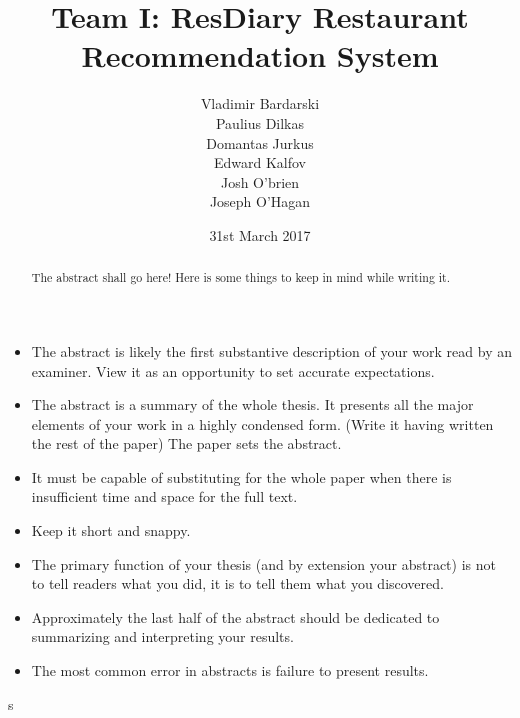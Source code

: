 \documentclass{l3proj}
\begin{document}
\title{Team I: ResDiary Restaurant Recommendation System}

\author{Vladimir Bardarski \\
        Paulius Dilkas \\
        Domantas Jurkus \\
        Edward Kalfov \\
        Josh O'brien \\
		Joseph O'Hagan}

\date{31st March 2017}

\maketitle

\begin{abstract}
The abstract shall go here! Here is some things to keep in mind while writing it.
\end{abstract}

\begin{itemize}
\item The abstract is likely the first substantive description of your work read by an examiner. View it as an opportunity to set accurate expectations.
\item The abstract is a summary of the whole thesis. It presents all the major elements of your work in a highly condensed form. (Write it having written the rest of the paper) The paper sets the abstract.
\item It must be capable of substituting for the whole paper when there is insufficient time and space for the full text.
\item Keep it short and snappy. 
\item The primary function of your thesis (and by extension your abstract) is not to tell readers what you did, it is to tell them what you discovered.
\item Approximately the last half of the abstract should be dedicated to summarizing and interpreting your results.
\item The most common error in abstracts is failure to present results.
\end{itemize}

\educationalconsent
s
\newpage
\end{document}
